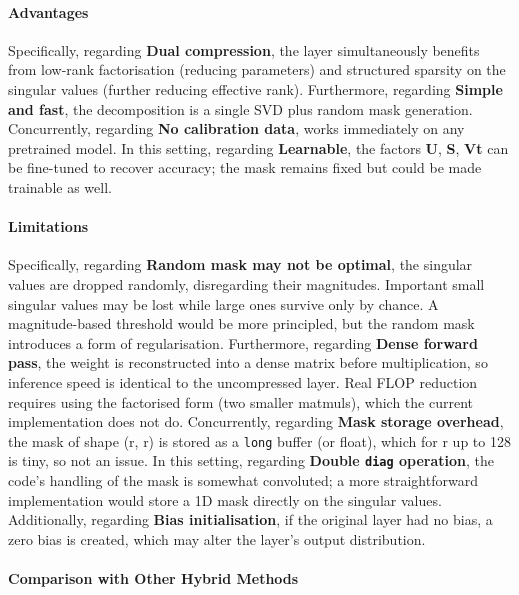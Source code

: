 \paragraph{Advantages}

Specifically, regarding \textbf{Dual compression}, the layer simultaneously benefits from low-rank factorisation (reducing parameters) and structured sparsity on the singular values (further reducing effective rank). Furthermore, regarding \textbf{Simple and fast}, the decomposition is a single SVD plus random mask generation. Concurrently, regarding \textbf{No calibration data}, works immediately on any pretrained model. In this setting, regarding \textbf{Learnable}, the factors \textbf{U}, \textbf{S}, \textbf{Vt} can be fine-tuned to recover accuracy; the mask remains fixed but could be made trainable as well.


\paragraph{Limitations}

Specifically, regarding \textbf{Random mask may not be optimal}, the singular values are dropped randomly, disregarding their magnitudes. Important small singular values may be lost while large ones survive only by chance. A magnitude-based threshold would be more principled, but the random mask introduces a form of regularisation. Furthermore, regarding \textbf{Dense forward pass}, the weight is reconstructed into a dense matrix before multiplication, so inference speed is identical to the uncompressed layer. Real FLOP reduction requires using the factorised form (two smaller matmuls), which the current implementation does not do. Concurrently, regarding \textbf{Mask storage overhead}, the mask of shape (r, r) is stored as a \texttt{long} buffer (or float), which for r up to 128 is tiny, so not an issue. In this setting, regarding \textbf{Double \texttt{diag} operation}, the code's handling of the mask is somewhat convoluted; a more straightforward implementation would store a 1D mask directly on the singular values. Additionally, regarding \textbf{Bias initialisation}, if the original layer had no bias, a zero bias is created, which may alter the layer's output distribution.


\paragraph{Comparison with Other Hybrid Methods}

